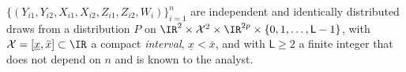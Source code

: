 %


\begin{assumption}[A0: Sampling]\label{ass:sampling}
$\{(Y_{i1},Y_{i2},X_{i1},X_{i2},Z_{i1},Z_{i2},W_i)\}_{i=1}^{n}$ are independent and identically
distributed draws from a distribution $P$ on
$\IR^{2}\times\mathcal X^{2}\times\IR^{2p}\times\{0,1,\dots,\mathsf L-1\}$, with
$\mathcal X=[\underline x,\bar x]\subset\IR$ a compact \emph{interval}, $\underline x<\bar x$, and
with $\mathsf L\ge2$ a finite integer that does not depend on $n$ and is known to the analyst.
\end{assumption}

